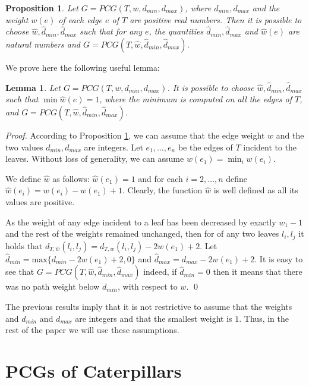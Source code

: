 \documentclass[review]{elsarticle}
\newtheorem{proposition}{Proposition}
\newtheorem{lemma}{Lemma}
\begin{document}
\begin{proposition} \cite{CMPS}
\label{prop.integer}
Let $G=PCG(T,w, d_{min},d_{max})$, where $d_{min}, d_{max}$ and 
the weight $w(e)$ of each edge $e$ of $T$ are positive
real numbers.
Then it is possible to choose $\hat{w},\hat{d}_{min},\hat{d}_{max}$ such that for any $e$, the quantities $\hat{d}_{min},\hat{d}_{max}$ and $\hat{w}(e)$  are natural numbers and $G=PCG(T,\hat{w},\hat{d}_{min},\hat{d}_{max})$.
\end{proposition}

We prove here the following useful lemma:
\begin{lemma}
\label{lemma.1}
Let $G=PCG(T,w, d_{min},d_{max})$. It is possible to choose $\hat{w},\hat{d}_{min},\hat{d}_{max}$ such that $\min \hat{w}(e)=1$, where the minimum is computed on all the edges of $T$, and  $G=PCG(T,\hat{w},\hat{d}_{min},\hat{d}_{max})$.
\end{lemma}

\begin{proof}
According to Proposition \ref{prop.integer}, we can assume that the edge weight $w$ and the two values $d_{min},d_{max}$ are integers.
Let $e_1, \ldots , e_n$ be the edges of $T$ incident to the leaves.
Without loss of generality, we can assume $w(e_1)=\min_i w(e_i)$.

We define $\hat{w}$ as follows:
$\hat{w}(e_1)=1$ and for each $i=2, \ldots , n$ define $\hat{w}(e_i)=w(e_i)-w(e_1)+1$.
Clearly, the function $\hat{w}$ is well defined as all its values are positive.

As the weight of any edge incident to a leaf has been decreased by exactly $w_1-1$ and the rest of the weights remained unchanged, then for of any two leaves $l_i,l_j$ it holds that  $d_{T, \hat{w}}(l_i,l_j)=d_{T, w}(l_i,l_j)-2w(e_1)+2$. 
Let $\hat{d}_{min}=\mbox{max}\{d_{min}-2w(e_1)+2, 0 \}$ and $\hat{d}_{max}=d_{max}-2w(e_1)+2$. 
It is easy to see that $G=PCG(T,\hat{w},\hat{d}_{min},\hat{d}_{max})$ indeed, if $\hat{d}_{min}=0$ then it means that there was no path weight below $d_{min}$, with respect to $w$. \qed
\end{proof}

The previous results imply that it is not restrictive to assume that the weights and $d_{min}$ and $d_{max}$ are integers and that the smallest weight is $1$.  Thus, in the rest of the paper we  will use these assumptions.

\section{PCGs of Caterpillars}
\end{document}
